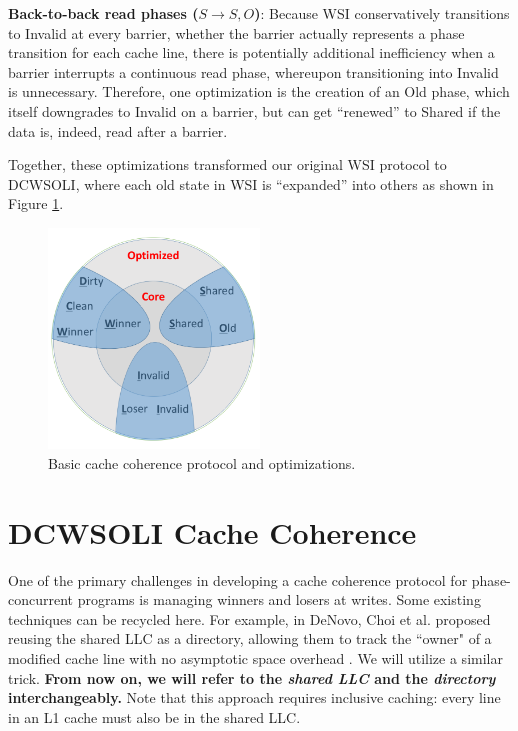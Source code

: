 \documentclass{article}
\begin{document}
\textbf{Back-to-back read phases ($S \rightarrow S, O$)}:
Because WSI conservatively transitions to Invalid at every barrier, whether the barrier actually represents a phase transition for each cache line, there is potentially additional inefficiency when a barrier interrupts a continuous read phase, whereupon transitioning into Invalid is unnecessary. Therefore, one optimization is the creation of an Old phase, which itself downgrades to Invalid on a barrier, but can get ``renewed'' to Shared if the data is, indeed, read after a barrier.

Together, these optimizations transformed our original WSI protocol to DCWSOLI, where each old state in WSI is ``expanded'' into others as shown in Figure \ref{wsi-to-dcwsoli}.

\begin{figure}[H]
\centering
\includegraphics[width=0.5\textwidth]{img/posterfig2.png}
\caption{Basic cache coherence protocol and optimizations.}
\label{wsi-to-dcwsoli}
\end{figure}

\section{DCWSOLI Cache Coherence}
One of the primary challenges in developing a cache coherence protocol for phase-concurrent programs is managing winners and losers at writes. Some existing techniques can be recycled here. For example, in DeNovo, Choi et al. proposed reusing the shared LLC as a directory, allowing them to track the ``owner" of a modified cache line with no asymptotic space overhead \cite{choi2010denovo}. We will utilize a similar trick. \textbf{From now on, we will refer to the \textit{shared LLC} and the \textit{directory} interchangeably.} Note that this approach requires inclusive caching: every line in an L1 cache must also be in the shared LLC.
\end{document}
